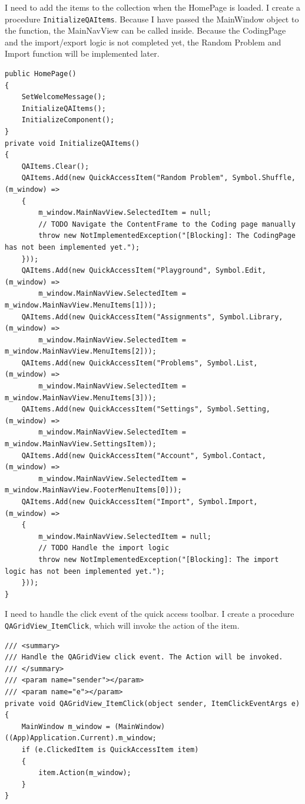 \documentclass[a4paper]{report}
\newcommand{\code}{\texttt}
\begin{document}
I need to add the items to the collection when the HomePage is loaded. I create a procedure \code{InitializeQAItems}. Because I have passed the MainWindow object to the function, the MainNavView can be called inside. Because the CodingPage and the import/export logic is not completed yet, the Random Problem and Import function will be implemented later.

\begin{verbatim}
public HomePage()
{
    SetWelcomeMessage();
    InitializeQAItems();
    InitializeComponent();
}
private void InitializeQAItems()
{
    QAItems.Clear();
    QAItems.Add(new QuickAccessItem("Random Problem", Symbol.Shuffle, (m_window) =>
    {
        m_window.MainNavView.SelectedItem = null;
        // TODO Navigate the ContentFrame to the Coding page manually
        throw new NotImplementedException("[Blocking]: The CodingPage has not been implemented yet.");
    }));
    QAItems.Add(new QuickAccessItem("Playground", Symbol.Edit, (m_window) =>
        m_window.MainNavView.SelectedItem = m_window.MainNavView.MenuItems[1]));
    QAItems.Add(new QuickAccessItem("Assignments", Symbol.Library, (m_window) =>
        m_window.MainNavView.SelectedItem = m_window.MainNavView.MenuItems[2]));
    QAItems.Add(new QuickAccessItem("Problems", Symbol.List, (m_window) =>
        m_window.MainNavView.SelectedItem = m_window.MainNavView.MenuItems[3]));
    QAItems.Add(new QuickAccessItem("Settings", Symbol.Setting, (m_window) =>
        m_window.MainNavView.SelectedItem = m_window.MainNavView.SettingsItem));
    QAItems.Add(new QuickAccessItem("Account", Symbol.Contact, (m_window) =>
        m_window.MainNavView.SelectedItem = m_window.MainNavView.FooterMenuItems[0]));
    QAItems.Add(new QuickAccessItem("Import", Symbol.Import, (m_window) =>
    {
        m_window.MainNavView.SelectedItem = null;
        // TODO Handle the import logic
        throw new NotImplementedException("[Blocking]: The import logic has not been implemented yet.");
    }));
}
\end{verbatim}

I need to handle the click event of the quick access toolbar. I create a procedure \code{QAGridView_ItemClick}, which will invoke the action of the item.

\begin{verbatim}
/// <summary>
/// Handle the QAGridView click event. The Action will be invoked.
/// </summary>
/// <param name="sender"></param>
/// <param name="e"></param>
private void QAGridView_ItemClick(object sender, ItemClickEventArgs e)
{
    MainWindow m_window = (MainWindow)((App)Application.Current).m_window;
    if (e.ClickedItem is QuickAccessItem item)
    {
        item.Action(m_window);
    }
}
\end{verbatim}
\end{document}
